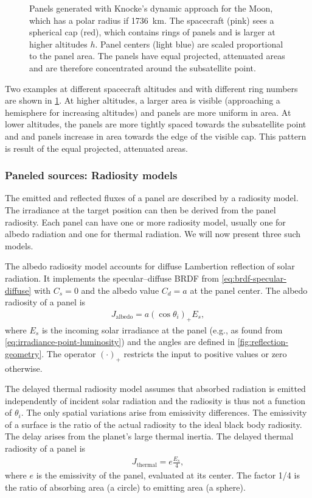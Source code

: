\begin{figure}[t]
   \caption{Panels generated with Knocke's dynamic approach for the Moon, which has a polar radius if \qty{1736}{\km}. The spacecraft (pink) sees a spherical cap (red), which contains rings of panels and is larger at higher altitudes $h$. Panel centers (light blue) are scaled proportional to the panel area. The panels have equal projected, attenuated areas and are therefore concentrated around the subsatellite point.}
   \label{fig:general-knocke-paneling}
\end{figure}

Two examples at different spacecraft altitudes and with different ring numbers are shown in \cref{fig:general-knocke-paneling}. At higher altitudes, a larger area is visible (approaching a hemisphere for increasing altitudes) and panels are more uniform in area. At lower altitudes, the panels are more tightly spaced towards the subsatellite point and and panels increase in area towards the edge of the visible cap. This pattern is result of the equal projected, attenuated areas.

\subsubsection{Paneled sources: Radiosity models}
The emitted and reflected fluxes of a panel are described by a radiosity model. The irradiance at the target position can then be derived from the panel radiosity. Each panel can have one or more radiosity model, usually one for albedo radiation and one for thermal radiation. We will now present three such models.

The albedo radiosity model accounts for diffuse Lambertion reflection of solar radiation. It implements the specular--diffuse \gls{BRDF} from \cref{eq:brdf-specular-diffuse} with $C_s = 0$ and the albedo value $C_d = a$ at the panel center. The albedo radiosity of a panel is~\cite{Knocke1988}
\begin{align}
    \label{eq:radiosity-albedo}
    J_\text{albedo} = a \left(\cos\theta_i\right)_+ E_s,
\end{align}
where $E_s$ is the incoming solar irradiance at the panel (e.g., as found from \cref{eq:irradiance-point-luminosity}) and the angles are defined in \cref{fig:reflection-geometry}. The operator $(\cdot)_+$ restricts the input to positive values or zero otherwise.

The delayed thermal radiosity model assumes that absorbed radiation is emitted independently of incident solar radiation and the radiosity is thus not a function of $\theta_i$. The only spatial variations arise from emissivity differences. The emissivity of a surface is the ratio of the actual radiosity to the ideal black body radiosity. The delay arises from the planet's large thermal inertia. The delayed thermal radiosity of a panel is~\cite{Knocke1988}
\begin{align}
    \label{eq:radiosity-thermal-delayed}
    J_\text{thermal} = e \frac{E_s}{4},
\end{align}
where $e$ is the emissivity of the panel, evaluated at its center. The factor 1/4 is the ratio of absorbing area (a circle) to emitting area (a sphere).

